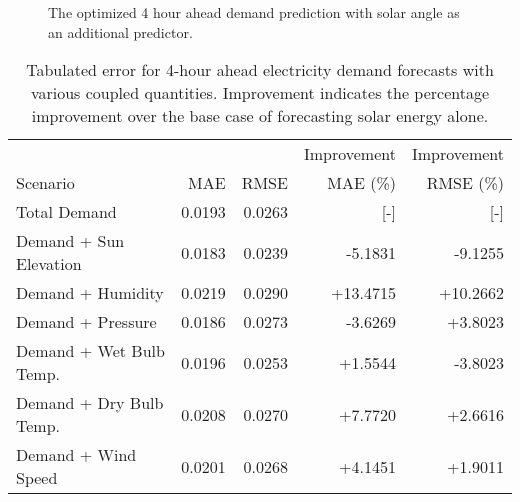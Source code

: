 \begin{figure*}[!ht]
  \centering
  
  \caption{The optimized 4 hour ahead demand prediction with solar angle as an additional predictor.}
  \label{fig:demand04}
\end{figure*}

  \begin{table*}[!ht]
    \centering
    \caption{Tabulated error for 4-hour ahead electricity demand forecasts with various coupled quantities. Improvement indicates the percentage improvement over the base case of forecasting solar energy alone.}
    \label{tab:demand04}
    \begin{tabular}{l|r|r|r|r}
      &  & & Improvement & Improvement \\
      Scenario  & MAE & RMSE & MAE (\%) & RMSE (\%)\\
      \hline
      Total Demand & 0.0193 & 0.0263 & [-] & [-] \\
      Demand + Sun Elevation & 0.0183 & 0.0239 & -5.1831 & -9.1255 \\
      Demand + Humidity & 0.0219 & 0.0290 & +13.4715 & +10.2662 \\
      Demand + Pressure & 0.0186 & 0.0273 & -3.6269 & +3.8023 \\
      Demand + Wet Bulb Temp. & 0.0196 & 0.0253 & +1.5544 & -3.8023 \\
      Demand + Dry Bulb Temp. & 0.0208 & 0.0270 & +7.7720 & +2.6616 \\
      Demand + Wind Speed & 0.0201 & 0.0268 & +4.1451 & +1.9011 \\
    \end{tabular}
  \end{table*}
